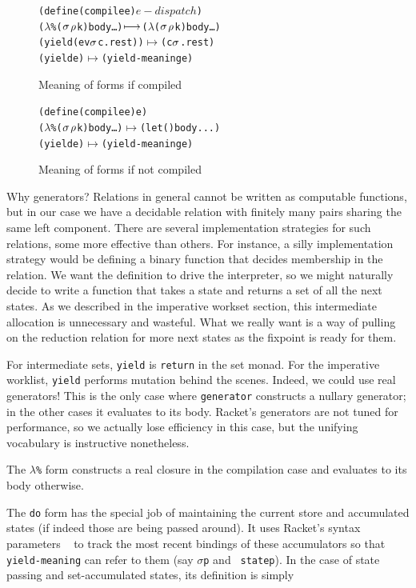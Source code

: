 \documentclass[preprint,onecolumn,9pt]{sigplanconf} %
\begin{document}
\begin{figure}
\begin{alltt}
(define (compile e) \(e-dispatch\))
(\(\lambda\)\% (\(\msto\) \(\menv\) k) body \ldots) \(\machstep\) (\(\lambda\) (\(\msto\) \(\menv\) k) body \ldots)
(yield (ev \(\msto\) c . rest)) \(\longmapsto\) (c \(\msto\) . rest)
(yield e) \(\longmapsto\) (yield-meaning e)
\end{alltt}
\caption{Meaning of forms if compiled}
\label{fig:cfm}
\end{figure}

\begin{figure}
\begin{alltt}
(define (compile e) e)
(\(\lambda\)\% (\(\msto\) \(\menv\) k) body \ldots) \(\longmapsto\) (let () body ...)
(yield e) \(\longmapsto\) (yield-meaning e)
\end{alltt}
\caption{Meaning of forms if not compiled}
\label{fig:ncfm}
\end{figure}

Why generators? Relations in general cannot be written as computable
functions, but in our case we have a decidable relation with finitely
many pairs sharing the same left component. There are several
implementation strategies for such relations, some more effective than
others. For instance, a silly implementation strategy would be
defining a binary function that decides membership in the relation. We
want the definition to drive the interpreter, so we might naturally
decide to write a function that takes a state and returns a set of all
the next states. As we described in the imperative workset section,
this intermediate allocation is unnecessary and wasteful. What we
really want is a way of pulling on the reduction relation for more
next states as the fixpoint is ready for them.

For intermediate sets, {\tt yield} is {\tt return} in the set
monad. For the imperative worklist, {\tt yield} performs mutation
behind the scenes. Indeed, we could use real generators! This is the
only case where {\tt generator} constructs a nullary generator; in the
other cases it evaluates to its body. Racket's generators are not
tuned for performance, so we actually lose efficiency in this case,
but the unifying vocabulary is instructive nonetheless.

The {\tt $\lambda$\%} form constructs a real closure in the
compilation case and evaluates to its body otherwise.

The {\tt do} form has the special job of maintaining the current store
and accumulated states (if indeed those are being passed around). It
uses Racket's syntax parameters ~\cite{ianjohnson:eli/stxparam} to
track the most recent bindings of these accumulators so that {\tt
  yield-meaning} can refer to them (say {\tt $\sigma$p} and {\tt
  statep}). In the case of state passing and set-accumulated states, its
definition is simply
\end{document}

